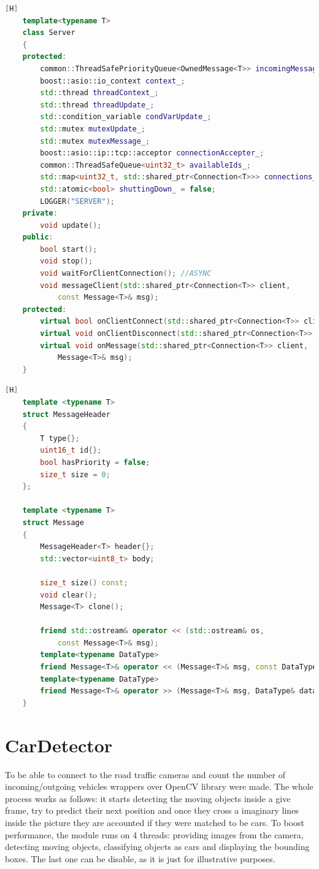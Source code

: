 \documentclass[17pt]{report}
\begin{document}
\pagebreak

\begin{lstlisting}[language = C++][H]
    template<typename T>
    class Server
    {
    protected:
        common::ThreadSafePriorityQueue<OwnedMessage<T>> incomingMessagesQueue_;
        boost::asio::io_context context_;
        std::thread threadContext_;
        std::thread threadUpdate_;
        std::condition_variable condVarUpdate_;
        std::mutex mutexUpdate_;
        std::mutex mutexMessage_;
        boost::asio::ip::tcp::acceptor connectionAccepter_;
        common::ThreadSafeQueue<uint32_t> availableIds_;
        std::map<uint32_t, std::shared_ptr<Connection<T>>> connections_;
        std::atomic<bool> shuttingDown_ = false;
        LOGGER("SERVER");
    private:
        void update();
    public:
        bool start();
        void stop();
        void waitForClientConnection(); //ASYNC
        void messageClient(std::shared_ptr<Connection<T>> client,
            const Message<T>& msg);
    protected:
        virtual bool onClientConnect(std::shared_ptr<Connection<T>> client);
        virtual void onClientDisconnect(std::shared_ptr<Connection<T>> client);
        virtual void onMessage(std::shared_ptr<Connection<T>> client,
            Message<T>& msg);
    }
\end{lstlisting}

\pagebreak

\begin{lstlisting}[language = C++][H]
    template <typename T>
    struct MessageHeader
    {
        T type{};
        uint16_t id{};
        bool hasPriority = false;
        size_t size = 0;
    };
    
    template <typename T>
    struct Message
    {
        MessageHeader<T> header{};
        std::vector<uint8_t> body;

        size_t size() const;
        void clear();
        Message<T> clone();

        friend std::ostream& operator << (std::ostream& os, 
            const Message<T>& msg);
        template<typename DataType>
        friend Message<T>& operator << (Message<T>& msg, const DataType& data)
        template<typename DataType>
        friend Message<T>& operator >> (Message<T>& msg, DataType& data)
    }
\end{lstlisting}   
\pagebreak

\section{CarDetector}
\indent \indent
To be able to connect to the road traffic cameras and count the number of 
incoming/outgoing vehicles wrappers over OpenCV library were made. The whole process 
works as follows: it starts detecting the moving objects inside a give frame, try to 
predict their next position and once they cross a imaginary lines inside the picture
they are accounted if they were matched to be cars. To boost performance, the 
module runs on 4 threads: providing images from the camera, detecting moving objects,
classifying objects as cars and displaying the bounding boxes. The last one can be 
disable, as it is just for illustrative purposes. \\
\end{document}
